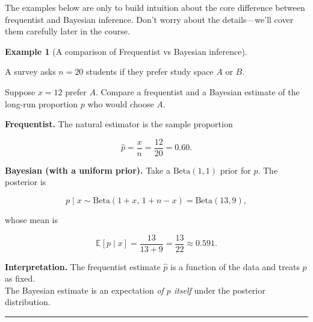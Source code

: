 \documentclass[
  letterpaper,
  DIV=11,
  numbers=noendperiod]{scrreprt}
\theoremstyle{definition}
\newtheorem{example}{Example}[chapter]
\theoremstyle{plain}
\theoremstyle{definition}
\theoremstyle{remark}
\begin{document}
The examples below are only to build intuition about the core difference
between frequentist and Bayesian inference. Don't worry about the
details---we'll cover them carefully later in the course.

\begin{example}[A comparison of Frequentist vs Bayesian
inference]\protect\hypertarget{exm-proportion-freq-bayes}{}\label{exm-proportion-freq-bayes}

A survey asks \(n=20\) students if they prefer study space \(A\) or
\(B\).

Suppose \(x=12\) prefer \(A\). Compare a frequentist and a Bayesian
estimate of the long-run proportion \(p\) who would choose \(A\).

\end{example}

\begin{tcolorbox}[enhanced jigsaw, left=2mm, toprule=.15mm, breakable, opacityback=0, titlerule=0mm, toptitle=1mm, colbacktitle=quarto-callout-tip-color!10!white, colframe=quarto-callout-tip-color-frame, coltitle=black, rightrule=.15mm, leftrule=.75mm, bottomrule=.15mm, arc=.35mm, bottomtitle=1mm, title=\textcolor{quarto-callout-tip-color}{\faLightbulb}\hspace{0.5em}{Solution}, colback=white, opacitybacktitle=0.6]

\textbf{Frequentist.} The natural estimator is the sample proportion

\[
\hat p=\frac{x}{n}=\frac{12}{20}=0.60.
\]

\textbf{Bayesian (with a uniform prior).} Take a \(\mathrm{Beta}(1,1)\)
prior for \(p\). The posterior is

\[
p \mid x \sim \mathrm{Beta}(1+x,\,1+n-x)=\mathrm{Beta}(13,9),
\]

whose mean is

\[
\mathbb{E}[p\mid x]=\frac{13}{13+9}=\frac{13}{22}\approx 0.591.
\]

\textbf{Interpretation.} The frequentist estimate \(\hat p\) is a
function of the data and treats \(p\) as fixed.\\
The Bayesian estimate is an expectation \emph{of \(p\) itself} under the
posterior distribution.

\end{tcolorbox}

\begin{center}\rule{0.5\linewidth}{0.5pt}\end{center}
\end{document}
